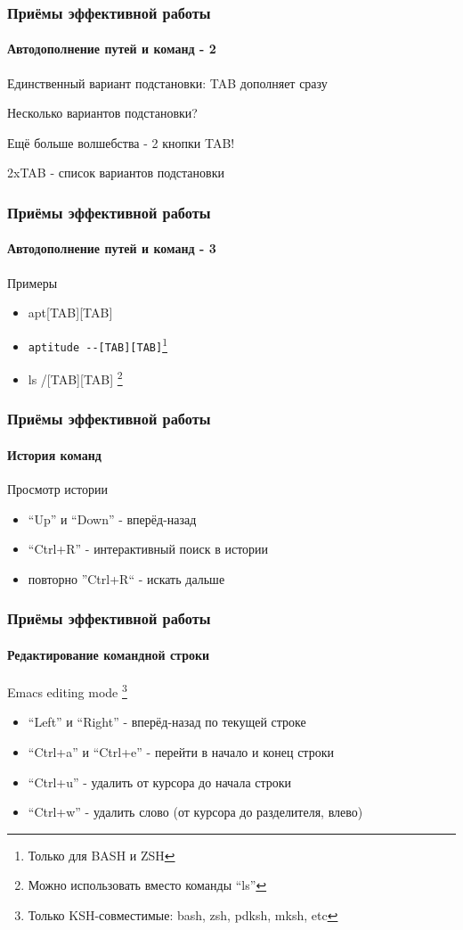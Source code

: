 \begin{frame}
  \frametitle{Приёмы эффективной работы}
  \framesubtitle{Автодополнение путей и команд - 2}
  
  \Large{\alert{Единственный вариант подстановки}: \newline TAB дополняет сразу} \pause

  \Large{\alert{Несколько вариантов подстановки?}} 

  \Large{Ещё больше волшебства - 2 кнопки TAB!} 

  \Large{\alert{2xTAB - список вариантов подстановки}}
\end{frame}

\begin{frame}[fragile]
  \frametitle{Приёмы эффективной работы}
  \framesubtitle{Автодополнение путей и команд - 3}
  
  \Huge{Примеры}

  \Large{
  \begin{itemize}
    \item apt[TAB][TAB]
    \item \verb+aptitude --[TAB][TAB]+\footnote{Только для BASH и ZSH}
    \item ls /[TAB][TAB] \footnote{Можно использовать вместо команды ``ls''}
  \end{itemize}
      }
\end{frame}
  

\begin{frame}
  \frametitle{Приёмы эффективной работы}
  \framesubtitle{История команд}

  \Large{\alert{Просмотр истории}}

  \begin{itemize}
    \item ``Up'' и ``Down'' - вперёд-назад \pause
    \item ``Ctrl+R'' - интерактивный поиск в истории \pause
    \item повторно ''Ctrl+R`` - искать дальше
  \end{itemize}
\end{frame}

\begin{frame}
  \frametitle{Приёмы эффективной работы}
  \framesubtitle{Редактирование командной строки}

  \Large{\alert{Emacs editing mode}} \footnote{Только KSH-совместимые: bash, zsh, pdksh, mksh, etc}

  \begin{itemize}
    \item ``Left'' и ``Right'' - вперёд-назад по текущей строке \pause
    \item ``Ctrl+a'' и ``Ctrl+e''  - перейти в начало и конец строки \pause
    \item ``Ctrl+u'' - удалить от курсора до начала строки \pause
    \item ``Ctrl+w'' - удалить слово (от курсора до разделителя, влево) 
  \end{itemize}
    
\end{frame}

